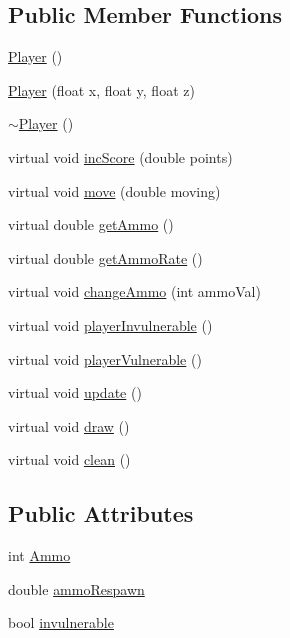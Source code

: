 \subsection*{Public Member Functions}
\begin{DoxyCompactItemize}
\item 
\hyperlink{classPlayer_affe0cc3cb714f6deb4e62f0c0d3f1fd8}{Player} ()
\item 
\hyperlink{classPlayer_a741be2b6a788863970c210081efb2102}{Player} (float x, float y, float z)
\item 
\hyperlink{classPlayer_a749d2c00e1fe0f5c2746f7505a58c062}{$\sim$\-Player} ()
\item 
virtual void \hyperlink{classPlayer_aeeb28c46b0ea75a0a85cbc4c71fccde9}{inc\-Score} (double points)
\item 
virtual void \hyperlink{classPlayer_a6ec12ce91eed06eaf794c663824a752e}{move} (double moving)
\item 
virtual double \hyperlink{classPlayer_aaaa378f4c5cdf0b85dd219cb1fcd4204}{get\-Ammo} ()
\item 
virtual double \hyperlink{classPlayer_ac6605cc08fc355909e44048fb52d7313}{get\-Ammo\-Rate} ()
\item 
virtual void \hyperlink{classPlayer_a6cbd4745a789166da1eb1b7f726fd2ef}{change\-Ammo} (int ammo\-Val)
\item 
virtual void \hyperlink{classPlayer_a640b10aecddb6182bffc7de94b776653}{player\-Invulnerable} ()
\item 
virtual void \hyperlink{classPlayer_af43a2209a8501246dbf2829fac976680}{player\-Vulnerable} ()
\item 
virtual void \hyperlink{classPlayer_a82c3476f3e65a4e2ac6bcd040771bdd4}{update} ()
\item 
virtual void \hyperlink{classPlayer_ac18c9d30d2997765321c62030a4b20b7}{draw} ()
\item 
virtual void \hyperlink{classPlayer_a883c81df5be3b931ecfa6c8de08acfbd}{clean} ()
\end{DoxyCompactItemize}
\subsection*{Public Attributes}
\begin{DoxyCompactItemize}
\item 
int \hyperlink{classPlayer_a689b73da19dd6d6932ffeb5d766709e6}{Ammo}
\item 
double \hyperlink{classPlayer_a38b0bf5bc8ff6e571922d4b51d2aa291}{ammo\-Respawn}
\item 
bool \hyperlink{classPlayer_a16e6b8b49d2f4433e07db406cea1fea5}{invulnerable}
\end{DoxyCompactItemize}

